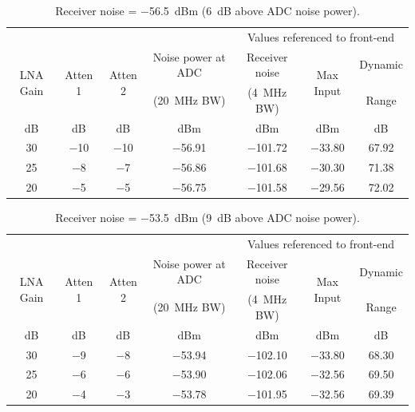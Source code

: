 \documentclass[12pt,letterpaper]{article}
\begin{document}
\begin{table}[htbp]
  \renewcommand{\multirowsetup}{\centering}
  \centering
  \caption{Receiver noise = $-$56.5~dBm (6~dB above ADC noise power).}
  \label{tab:6dB_noise_rise}
  \vspace{0.5em}
  \begin{tabular}{ccccccc}
    & & & & \multicolumn{3}{c}{Values referenced to front-end} \\
    \cline{5-7}
    \multirow{2}{*}{LNA Gain} & \multirow{2}{*}{Atten 1} & \multirow{2}{*}{Atten 2} & Noise power at ADC & Receiver noise & \multirow{2}{*}{Max Input} & Dynamic \\
    & & & (20~MHz BW) & (4~MHz BW) & & Range \\
    dB & dB & dB & dBm & dBm & dBm & dB \\
    \hline
    30 & $-$10 & $-$10 & $-$56.91 & $-$101.72 & $-$33.80 & 67.92 \\
    25 &  $-$8 &  $-$7 & $-$56.86 & $-$101.68 & $-$30.30 & 71.38 \\
    20 &  $-$5 &  $-$5 & $-$56.75 & $-$101.58 & $-$29.56 & 72.02 \\
    \hline
  \end{tabular}
\end{table}

\begin{table}[htbp]
  \renewcommand{\multirowsetup}{\centering}
  \centering
  \caption{Receiver noise = $-$53.5~dBm (9~dB above ADC noise power).}
  \label{tab:9dB_noise_rise}
  \vspace{0.5em}
  \begin{tabular}{ccccccc}
    & & & & \multicolumn{3}{c}{Values referenced to front-end} \\
    \cline{5-7}
    \multirow{2}{*}{LNA Gain} & \multirow{2}{*}{Atten 1} & \multirow{2}{*}{Atten 2} & Noise power at ADC & Receiver noise & \multirow{2}{*}{Max Input} & Dynamic \\
    & & & (20~MHz BW) & (4~MHz BW) & & Range \\
    dB & dB & dB & dBm & dBm & dBm & dB \\
    \hline
    30 &  $-$9 &  $-$8 & $-$53.94 & $-$102.10 & $-$33.80 & 68.30 \\
    25 &  $-$6 &  $-$6 & $-$53.90 & $-$102.06 & $-$32.56 & 69.50 \\
    20 &  $-$4 &  $-$3 & $-$53.78 & $-$101.95 & $-$32.56 & 69.39 \\
    \hline
  \end{tabular}
\end{table}
\end{document}

